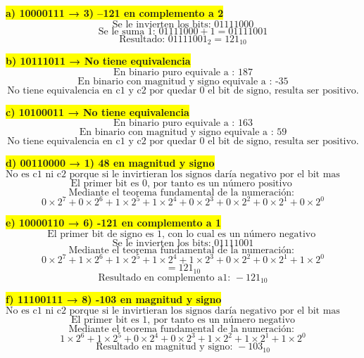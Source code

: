 \documentclass[a4paper,12pt]{article}
\begin{document}
	\begin{center}
		\colorbox{yellow}{{\textbf{a) 10000111 → 3)  –121 en complemento a 2}}}
		\[
		\text{Se le invierten los bits: } 01111000
		\]
		\[
		\text{Se le suma 1: } 01111000 + 1 = 01111001
		\]
		\[
		\boxed{\text{Resultado: } 01111001_2 = 121_{10}}
		\]
	\end{center}

	\begin{center}
		\colorbox{yellow}{{\textbf{b) 10111011 → No tiene equivalencia }}}
		\[
		\text{En binario puro equivale a : } 187
		\]
		\[
		\text{En binario con magnitud y signo equivale a : -35} 
		\]
		\[
		\text{No tiene equivalencia en c1 y c2 por quedar 0 el bit de signo,  resulta ser positivo.}
		\]
	\end{center}

	\begin{center}
		\colorbox{yellow}{{\textbf{c) 10100011 → No tiene equivalencia }}}
		\[
		\text{En binario puro equivale a : } 163
		\]
		\[
		\text{En binario con magnitud y signo equivale a : 59} 
		\]
		\[
		\text{No tiene equivalencia en c1 y c2 por quedar 0 el bit de signo, resulta ser positivo.}
		\]
	\end{center}

	\begin{center}
		\colorbox{yellow}{{\textbf{d) 00110000 → 1) 48 en magnitud y signo}}}
		\[
		\text{No es c1 ni c2 porque si le invirtieran los signos daría negativo por el bit mas significativo } 
		\]
		\[
		\text{El primer bit es 0, por tanto es un número positivo }
		\]
		\[
		{\text{Mediante el teorema fundamental de la numeración: } }
		\]
		\[
		0\times2^{7} + 0\times2^{6} + 1\times2^{5} + 1\times2^{4} + 0\times2^{3} + 0\times2^{2} + 0\times2^{1} + 0\times2^{0}
		\]
	\end{center}

	\begin{center}
		\colorbox{yellow}{{\textbf{e) 10000110 → 6) -121 en complemento a 1}}}
		\[
		\text{El primer bit de signo es 1, con lo cual es un número negativo }
		\]
		\[
		\text{Se le invierten los bits: } 01111001
		\]
		\[
		{\text{Mediante el teorema fundamental de la numeración: } }
		\]
		\[
		0\times2^{7} + 1\times2^{6} + 1\times2^{5} + 1\times2^{4} + 1\times2^{3} + 0\times2^{2} + 0\times2^{1} + 1\times2^{0} 
		\]
		\[ { = 121_{10}} \]	
		\[
		\boxed{\text{Resultado en complemento a1: } -121_{10}}
		\]
	\end{center}

	\begin{center}
		\colorbox{yellow}{{\textbf{f) 11100111 → 8) -103 en magnitud y signo}}}
		\[
		\text{No es c1 ni c2 porque si le invirtieran los signos daría negativo por el bit mas significativo } 
		\]
		\[
		\text{El primer bit es 1, por tanto es un número negativo}
		\]
		\[
		{\text{Mediante el teorema fundamental de la numeración: } }
		\]
		\[
		1\times2^{6} + 1\times2^{5} + 0\times2^{4} + 0\times2^{3} + 1\times2^{2} + 1\times2^{1} + 1\times2^{0}
		\]
		\[
		\boxed{\text{Resultado en magnitud y signo: } -103_{10}}
		\]
	\end{center}
\end{document}
